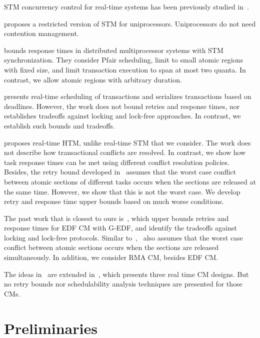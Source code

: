 \documentclass{sig-alternate}
\begin{document}
STM concurrency control for real-time systems has been previously studied in~\cite{manson2006preemptible,fahmy2009bounding,sarni2009real,schoeberl2010rttm,key-1,barrosmanaging}.


\cite{manson2006preemptible} proposes a restricted version of STM for uniprocessors. Uniprocessors do not need contention management.

\cite{fahmy2009bounding} bounds response times in distributed multiprocessor systems with STM synchronization. They consider Pfair scheduling, limit to small atomic regions with fixed size, and limit transaction execution to span at most two quanta. In contrast, we allow atomic regions with  arbitrary duration. 

\cite{sarni2009real} presents real-time scheduling of transactions and serializes transactions based on deadlines. However, the work does not bound retries and response times, nor establishes  tradeoffs against locking and lock-free approaches. In contrast, we establish such bounds and tradeoffs.


\cite{schoeberl2010rttm} proposes real-time HTM, unlike real-time STM that we consider. 
The work does not describe how transactional conflicts are resolved. 
In contrast, we show how task response times can be met using different conflict resolution policies. 
Besides, the retry bound developed in~\cite{schoeberl2010rttm} assumes that the worst case conflict between atomic sections of different tasks occurs when the sections are released at the same time. However, we show that this is not the worst case. We develop retry and response time upper bounds based on much worse conditions.


The past work that is closest to ours is~\cite{key-1}, which upper bounds retries and response times for  EDF CM with G-EDF, and identify the tradeoffs against locking and lock-free protocols. Similar to~\cite{schoeberl2010rttm},~\cite{key-1} also assumes that the worst case conflict between atomic sections occurs when the sections are released simultaneously. 
In addition, we consider RMA CM, besides EDF CM.

The ideas in~\cite{key-1} are extended in~\cite{barrosmanaging}, which presents three real time CM designs. But no retry bounds nor schedulability analysis techniques are presented for those CMs. 


\section{Preliminaries}
\label{sec:model}
\end{document}
